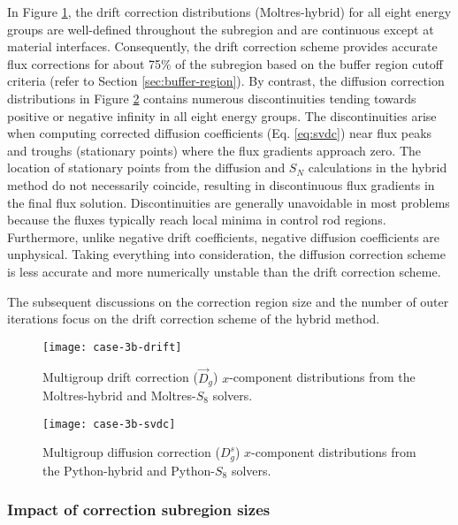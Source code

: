 In Figure \ref{fig:3b-drift}, the drift
correction distributions (Moltres-hybrid) for all eight energy groups are well-defined throughout
the subregion and are continuous except at material interfaces. Consequently, the drift correction
scheme provides accurate flux corrections for about 75\% of the subregion based on the buffer
region cutoff criteria (refer to Section \ref{sec:buffer-region}). By contrast, the diffusion
correction distributions in Figure \ref{fig:3b-svdc} contains numerous discontinuities tending towards
positive or negative infinity in all eight energy groups. The discontinuities arise when
computing corrected diffusion coefficients (Eq. \ref{eq:svdc}) near flux peaks and troughs
(stationary points) where the flux gradients approach zero. The location of stationary points from
the diffusion and $S_N$ calculations in the hybrid method do not necessarily coincide, resulting in
discontinuous flux gradients in the final flux solution. Discontinuities are generally unavoidable
in most problems because the fluxes typically reach local minima in control rod regions.
Furthermore, unlike negative drift coefficients, negative diffusion coefficients are unphysical.
Taking everything into consideration, the diffusion correction scheme is less accurate and more
numerically unstable than the drift correction scheme.

The subsequent discussions on the correction region size and the number of outer
iterations focus on the drift correction scheme of the hybrid method.

\begin{figure}[htb!]
  \centering
  \texttt{[image: case-3b-drift]}
  \caption{Multigroup drift correction ($\vec{D}_g$) $x$-component distributions from the
  Moltres-hybrid and Moltres-$S_8$ solvers.}
  \label{fig:3b-drift}
\end{figure}

\begin{figure}[htb!]
  \centering
  \texttt{[image: case-3b-svdc]}
  \caption{Multigroup diffusion correction ($D^s_g$) $x$-component distributions from the
    Python-hybrid and Python-$S_8$ solvers.}
  \label{fig:3b-svdc}
\end{figure}

\FloatBarrier

\subsubsection{Impact of correction subregion sizes}

